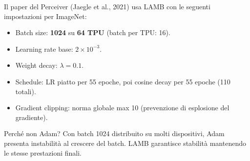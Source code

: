 \documentclass[
  11pt,
]{article}
\begin{document}
\begin{notabox}[title={\textbf{LAMB nel Perceiver IO}}]
Il paper del Perceiver (Jaegle et al., 2021) usa LAMB con le seguenti impostazioni per ImageNet:
\begin{itemize}
  \item Batch size: \textbf{1024} su \textbf{64 TPU} (batch per TPU: 16).
  \item Learning rate base: $2 \times 10^{-3}$.
  \item Weight decay: $\lambda = 0.1$.
  \item Schedule: LR piatto per 55 epoche, poi cosine decay per 55 epoche (110 totali).
  \item Gradient clipping: norma globale max 10 (prevenzione di esplosione del gradiente).
\end{itemize}
Perché non Adam? Con batch 1024 distribuito su molti dispositivi, Adam presenta instabilità al crescere del batch. LAMB garantisce stabilità mantenendo le stesse prestazioni finali.
\end{notabox}
\end{document}

